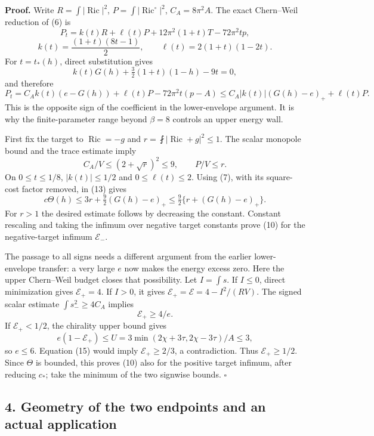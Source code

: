 \documentclass[
  10pt,
]{article}
\begin{document}
\textbf{Proof.} Write \(R=\int|\operatorname{Ric}|^2\),
\(P=\int|\operatorname{Ric}^{\circ}|^2\), \(C_A=8\pi^2A\). The exact
Chern--Weil reduction of (6) is \[
 P_t=k(t)R+\ell(t)P+12\pi^2(1+t)T-72\pi^2tp,
\] \[
 k(t)=\frac{(1+t)(8t-1)}2,\qquad
 \ell(t)=2(1+t)(1-2t).                                  \tag{12}
\] For \(t=t_*(h)\), direct substitution gives \[
 k(t)G(h)+\tfrac32(1+t)(1-h)-9t=0,
\] and therefore \[
 P_t=C_A k(t)(e-G(h))+\ell(t)P-72\pi^2t(p-A)
       \le C_A|k(t)|(G(h)-e)_++\ell(t)P.                \tag{13}
\] This is the opposite sign of the coefficient in the lower-envelope
argument. It is why the finite-parameter range beyond \(\beta=8\)
controls an upper energy wall.

First fix the target to \(\operatorname{Ric}=-g\) and
\(r=\fint|\operatorname{Ric}+g|^2\le1\). The scalar monopole bound and
the trace estimate imply \[
 C_A/V\le(2+\sqrt r)^2\le9,\qquad P/V\le r.
\] On \(0\le t\le1/8\), \(|k(t)|\le1/2\) and \(0\le\ell(t)\le2\). Using
(7), with its square-cost factor removed, in (13) gives \[
 c\Theta(h)\le3r+\tfrac92(G(h)-e)_+
              \le\tfrac92\{r+(G(h)-e)_+\}.             \tag{14}
\] For \(r>1\) the desired estimate follows by decreasing the constant.
Constant rescaling and taking the infimum over negative target constants
prove (10) for the negative-target infimum \(\mathcal E_-\).

The passage to all signs needs a different argument from the earlier
lower-envelope transfer: a very large \(e\) now makes the energy excess
zero. Here the upper Chern--Weil budget closes that possibility. Let
\(I=\int s\). If \(I\le0\), direct minimization gives
\(\mathcal E_+=4\). If \(I>0\), it gives
\(\mathcal E_+=\mathcal E=4-I^2/(RV)\). The signed scalar estimate
\(\int s_-^2\ge4C_A\) implies \[
 \mathcal E_+\ge4/e.                                   \tag{15}
\] If \(\mathcal E_+<1/2\), the chirality upper bound gives \[
 e(1-\mathcal E_+)\le
 U=3\min(2\chi+3\tau,2\chi-3\tau)/A\le3,
\] so \(e\le6\). Equation (15) would imply \(\mathcal E_+\ge2/3\), a
contradiction. Thus \(\mathcal E_+\ge1/2\). Since \(\Theta\) is bounded,
this proves (10) also for the positive target infimum, after reducing
\(c_*\); take the minimum of the two signwise bounds. \(\square\)

\hypertarget{geometry-of-the-two-endpoints-and-an-actual-application}{%
\subsection{4. Geometry of the two endpoints and an actual
application}\label{geometry-of-the-two-endpoints-and-an-actual-application}}
\end{document}
